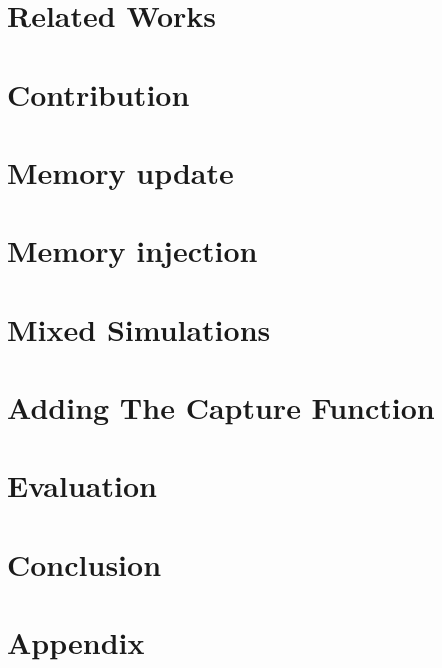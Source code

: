 \documentclass{llncs2e/llncs}
\begin{document}
\section{Related Works}


\section{Contribution}

\section{Memory update}

\section{Memory injection}

\section{Mixed Simulations}

\section{Adding The Capture Function}


\section{Evaluation}


\section{Conclusion}


%
%
\newpage
\nocite{*}



\newpage
\section{Appendix}

\end{document}

